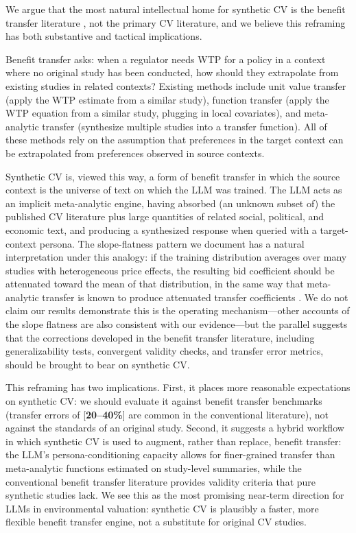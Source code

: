\documentclass[12pt]{article}
\begin{document}
We argue that the most natural intellectual home for synthetic CV is the
benefit transfer literature \parencite{Rosenberger2017, Loomis2015, Boyle2010},
not the primary CV literature, and we believe this reframing has both
substantive and tactical implications.

Benefit transfer asks: when a regulator needs WTP for a policy in a
context where no original study has been conducted, how should they
extrapolate from existing studies in related contexts? Existing methods
include unit value transfer (apply the WTP estimate from a similar
study), function transfer (apply the WTP equation from a similar study,
plugging in local covariates), and meta-analytic transfer (synthesize
multiple studies into a transfer function). All of these methods rely on
the assumption that preferences in the target context can be
extrapolated from preferences observed in source contexts.

Synthetic CV is, viewed this way, a form of benefit transfer in which
the source context is the universe of text on which the LLM was trained.
The LLM acts as an implicit meta-analytic engine, having absorbed (an
unknown subset of) the published CV literature plus large quantities of
related social, political, and economic text, and producing a
synthesized response when queried with a target-context persona. The
slope-flatness pattern we document has a natural interpretation under
this analogy: if the training distribution averages over many studies
with heterogeneous price effects, the resulting bid coefficient should
be attenuated toward the mean of that distribution, in the same way that
meta-analytic transfer is known to produce attenuated transfer
coefficients \parencite{Bergstrom2008}. We do not claim our results
demonstrate this is the operating mechanism---other accounts of the
slope flatness are also consistent with our evidence---but the parallel
suggests that the corrections developed in the benefit transfer
literature, including generalizability tests, convergent validity
checks, and transfer error metrics, should be brought to bear on
synthetic CV.

This reframing has two implications. First, it places more reasonable
expectations on synthetic CV: we should evaluate it against benefit
transfer benchmarks (transfer errors of [\textbf{20--40\%}] are common
in the conventional literature), not against the standards of an
original study. Second, it suggests a hybrid workflow in which synthetic
CV is used to augment, rather than replace, benefit transfer: the LLM's
persona-conditioning capacity allows for finer-grained transfer than
meta-analytic functions estimated on study-level summaries, while the
conventional benefit transfer literature provides validity criteria that
pure synthetic studies lack. We see this as the most promising near-term
direction for LLMs in environmental valuation: synthetic CV is plausibly
a faster, more flexible benefit transfer engine, not a substitute for
original CV studies.
\end{document}
